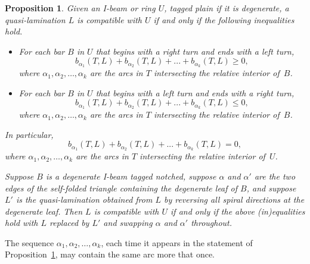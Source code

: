 \documentclass{amsart}
\newtheorem{prop}[proposition]{Proposition}
\theoremstyle{definition}
\theoremstyle{remark}
\numberwithin{equation}{section}
\newcommand{\0}{{\mathbf{0}}}
\begin{document}
\begin{prop}\label{prop: ineqs}
Given an I-beam or ring $U$, tagged plain if it is degenerate, a quasi-lamination $L$ is compatible with $U$ if and only if the following inequalities hold.
\begin{itemize}
\item For each bar $B$ in $U$ that begins with a right turn and ends with a left turn,
\[ b_{\alpha_1}(T,L) + b_{\alpha_2}(T,L) + ... + b_{\alpha_k}(T,L) \geq 0,\]
where $\alpha_1, \alpha_2,\ldots,\alpha_k$ are the arcs in $T$ intersecting the relative interior of~$B$.
\item For each bar $B$ in $U$ that begins with a left turn and ends with a right turn,
\[ b_{\alpha_1}(T,L) + b_{\alpha_2}(T,L) + ... + b_{\alpha_k}(T,L) \leq 0,\]
where $\alpha_1, \alpha_2,\ldots,\alpha_k$ are the arcs in $T$ intersecting the relative interior of~$B$.
\end{itemize}
In particular, 
\[ b_{\alpha_1}(T,L) + b_{\alpha_2}(T,L) + ... + b_{\alpha_k}(T,L) =0,\]
where $\alpha_1, \alpha_2,\ldots,\alpha_k$ are the arcs in $T$ intersecting the relative interior of~$U$.

Suppose $B$ is a degenerate I-beam tagged notched, suppose $\alpha$ and $\alpha'$ are the two edges of the self-folded triangle containing the degenerate leaf of $B$, and suppose $L'$ is the quasi-lamination obtained from $L$ by reversing all spiral directions at the degenerate leaf. 
Then $L$ is compatible with $U$ if and only if the above (in)equalities hold with $L$ replaced by $L'$ and swapping $\alpha$ and $\alpha'$ throughout.
\end{prop}
The sequence $\alpha_1, \alpha_2,\ldots,\alpha_k$, each time it appears in the statement of Proposition~\ref{prop: ineqs}, may contain the same arc more that once.
\end{document}

